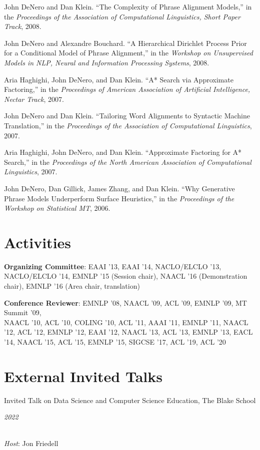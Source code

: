\documentclass[margin,line]{res}
\newcommand{\dated}[2]{\parbox[t]{4.4in}{#1} \hspace{0.4in}
											 \parbox[t]{1in}{ {\it #2 } } }
\begin{document}
\begin{resume}
John DeNero and Dan Klein. ``The Complexity of Phrase Alignment Models,'' in the {\it Proceedings of the Association of Computational Linguistics, Short Paper Track}, 2008.

John DeNero and Alexandre Bouchard. ``A Hierarchical Dirichlet Process Prior for a Conditional Model of Phrase Alignment,'' in the {\it Workshop on Unsupervised Models in NLP, Neural and Information Processing Systems}, 2008.

Aria Haghighi, John DeNero, and Dan Klein. ``A* Search via Approximate Factoring,'' in the {\it Proceedings of American Association of Artificial Intelligence, Nectar Track}, 2007.

John DeNero and Dan Klein. ``Tailoring Word Alignments to Syntactic Machine Translation,'' in the {\it Proceedings of the Association of Computational Linguistics}, 2007.

Aria Haghighi, John DeNero, and Dan Klein. ``Approximate Factoring for A* Search,'' in the {\it Proceedings of the North American Association of Computational Linguistics}, 2007.

John DeNero, Dan Gillick, James Zhang, and Dan Klein. ``Why Generative Phrase Models Underperform Surface Heuristics,'' in the {\it Proceedings of the Workshop on Statistical MT}, 2006.

\section{\sc Activities}

{\bf Organizing Committee}: EAAI '13, EAAI '14, NACLO/ELCLO '13, NACLO/ELCLO
'14, EMNLP '15 (Session chair), NAACL '16 (Demonstration chair), EMNLP '16 (Area
chair, translation)

{\bf Conference Reviewer}: EMNLP '08, NAACL '09, ACL '09, EMNLP '09, MT Summit
'09,\\ NAACL '10, ACL '10, COLING '10, ACL '11, AAAI '11, EMNLP '11, NAACL '12,
ACL '12, EMNLP '12, EAAI '12, NAACL '13, ACL '13, EMNLP '13, EACL '14,
NAACL '15, ACL '15, EMNLP '15, SIGCSE '17, ACL '19, ACL '20

\section{\sc External Invited Talks }

\dated{Invited Talk on Data Science and Computer Science Education, The Blake School} {2022} \\
{\em Host}: Jon Friedell


\end{resume}
\end{document}
